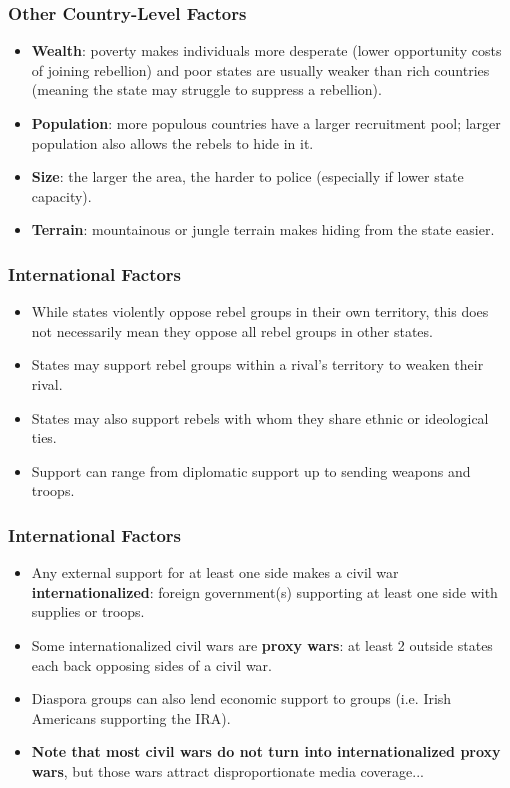 \documentclass[handout]{beamer}
\begin{document}
\begin{frame} 
\frametitle{\LARGE{Other Country-Level Factors}}
\begin{itemize}
		\item \textbf{Wealth}: poverty makes individuals more desperate (lower opportunity costs of joining rebellion) and poor states are usually weaker than rich countries (meaning the state may struggle to suppress a rebellion). \pause
		\item \textbf{Population}: more populous countries have a larger recruitment pool; larger population also allows the rebels to hide in it. \pause
		\item \textbf{Size}: the larger the area, the harder to police (especially if lower state capacity). \pause 
		\item \textbf{Terrain}: mountainous or jungle terrain makes hiding from the state easier.
\end{itemize}
\end{frame}

\begin{frame} 
	\frametitle{\LARGE{International Factors}}
	\begin{itemize}
		\item While states violently oppose rebel groups in their own territory, this does not necessarily mean they oppose all rebel groups in other states. \pause
		\item States may support rebel groups within a rival's territory to weaken their rival. \pause
		\item States may also support rebels with whom they share ethnic or ideological ties. \pause
		\item Support can range from diplomatic support up to sending weapons and troops. 
	\end{itemize}
\end{frame}

\begin{frame} 
\frametitle{\LARGE{International Factors}}
\begin{itemize}
		\item Any external support for at least one side makes a civil war \textbf{internationalized}: foreign government(s) supporting at least one side with supplies or troops. \pause
		\item Some internationalized civil wars are \textbf{proxy wars}: at least 2 outside states each back opposing sides of a civil war. \pause
		\item Diaspora groups can also lend economic support to groups (i.e. Irish Americans supporting the IRA).\pause
		\item \textbf{Note that most civil wars do not turn into internationalized proxy wars}, but those wars attract disproportionate media coverage...
\end{itemize}
\end{frame}
\end{document}
